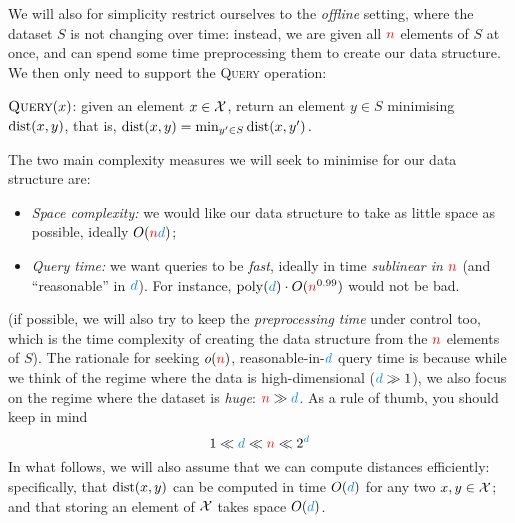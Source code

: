 \begin{figure}

\end{figure}

We will also for simplicity restrict ourselves to the \emph{offline} setting, where the dataset $S$ is not changing over time: instead, we are given all ${\textcolor{red}{n}}$ elements of $S$ at once, and can spend some time preprocessing them to create our data structure. We then only need to support the \textsc{Query} operation:
\begin{framed}
$\textsc{Query}(x)$: given an element $x\in \mathcal{X}$, return an element $y\in S$ minimising $\dist{x}{y}$, that is,
$
    \dist{x}{y} = \min_{y'\in S} \dist{x}{y'}\,.
$
\end{framed}
The two main complexity measures we will seek to minimise for our data structure are:
\begin{itemize}
    \item\emph{Space complexity:} we would like our data structure to take as little space as possible, ideally $O(\ns\dims)$;
    \item\emph{Query time:} we want queries to be \emph{fast}, ideally in time \emph{sublinear in ${\textcolor{red}{n}}$} (and ``reasonable'' in $\dims$). For instance, $\poly(\dims)\cdot O(\ns^{0.99})$ would not be bad.
\end{itemize}
\noindent (if possible, we will also try to keep the \emph{preprocessing time} under control too, which is the time complexity of creating the data structure from the ${\textcolor{red}{n}}$ elements of $S$). The rationale for seeking $o({\textcolor{red}{n}})$, reasonable-in-$\dims$ query time is because while we think of the regime where the data is high-dimensional ($\dims \gg 1$), we also focus on the regime where the dataset is \emph{huge}: $\ns \gg \dims$. As a rule of thumb, you should keep in mind
\[
1 \ll \dims \ll \ns \ll 2^\dims
\]
In what follows, we will also assume that we can compute distances efficiently: specifically, that $\dist{x}{y}$ can be computed in time $O(\dims)$ for any two $x,y\in\mathcal{X}$; and that storing an element of $\mathcal{X}$ takes space $O(\dims)$.

